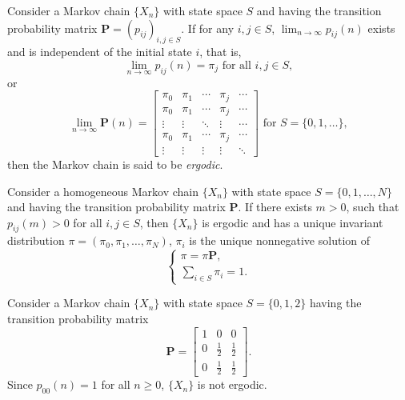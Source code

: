 \begin{definition}
  Consider a Markov chain \(\{X_n\}\) with state space \(S\) and having the transition probability matrix \(\mathbf{P} = (p_{ij})_{i, j \in S}\). If for any \(i, j \in S\), \(\lim_{n \to \infty} p_{ij}(n)\) exists and is independent of the initial state \(i\), that is,
  \[
    \lim_{n \to \infty} p_{ij}(n) = \pi_j \text{ for all } i, j \in S,
  \]
  or
  \[
    \lim_{n \to \infty} \mathbf{P}(n) = \begin{bmatrix}
      \pi_0 & \pi_1 & \cdots & \pi_j & \cdots \\
      \pi_0 & \pi_1 & \cdots & \pi_j & \cdots \\
      \vdots & \vdots & \ddots & \vdots & \cdots \\
      \pi_0 & \pi_1 & \cdots & \pi_j & \cdots \\
      \vdots & \vdots & \vdots & \vdots & \ddots
    \end{bmatrix}
    \text{ for } S = \{0, 1, \dots\},
  \]
  then the Markov chain is said to be \emph{ergodic}.
\end{definition}

\begin{theorem}
  Consider a homogeneous Markov chain \(\{X_n\}\) with state space \(S = \{0, 1, \dots, N\}\) and having the transition probability matrix \(\mathbf{P}\). If there exists \(m > 0\), such that \(p_{ij}(m) > 0\) for all \(i, j \in S\), then \(\{X_n\}\) is ergodic and has a unique invariant distribution \(\pi = (\pi_0, \pi_1, \dots, \pi_N)\), \(\pi_i\) is the unique nonnegative solution of
  \[
    \begin{cases}
      \pi = \pi \mathbf{P}, \\
      \sum_{i \in S} \pi_i = 1.
    \end{cases}
  \]
\end{theorem}

\begin{example}
  Consider a Markov chain \(\{X_n\}\) with state space \(S = \{0, 1, 2\}\) having the transition probability matrix
  \[
    \mathbf{P} = \begin{bmatrix}
      1 & 0 & 0 \\
      0 & \frac{1}{2} & \frac{1}{2} \\
      0 & \frac{1}{2} & \frac{1}{2}
    \end{bmatrix}.
  \]
  Since \(p_{00}(n) = 1\) for all \(n \geq 0\), \(\{X_n\}\) is not ergodic.
\end{example}

